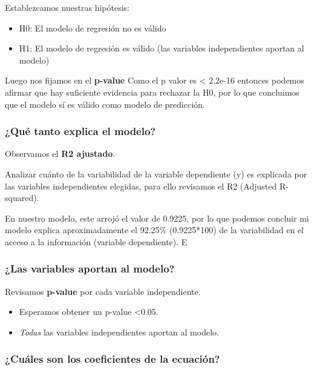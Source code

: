 \documentclass[
]{article}
\providecommand{\tightlist}{%
  \setlength{\itemsep}{0pt}\setlength{\parskip}{0pt}}
\begin{document}
Establezcamos nuestras hipótesis:

\begin{itemize}
\tightlist
\item
  H0: El modelo de regresión no es válido
\item
  H1: El modelo de regresión es válido (las variables independientes
  aportan al modelo)
\end{itemize}

Luego nos fijamos en el \textbf{p-value} Como el p valor es \textless{}
2.2e-16 entonces podemos afirmar que hay suficiente evidencia para
rechazar la H0, por lo que concluimos que el modelo sí es válido como
modelo de predicción.

\subsubsection{\texorpdfstring{\textbf{¿Qué tanto explica el
modelo?}}{¿Qué tanto explica el modelo?}}\label{quuxe9-tanto-explica-el-modelo-1}

Observamos el \textbf{R2 ajustado}.

Analizar cuánto de la variabilidad de la variable dependiente (y) es
explicada por las variables independientes elegidas, para ello revisamos
el R2 (Adjusted R-squared).

En nuestro modelo, este arrojó el valor de 0.9225, por lo que podemos
concluir mi modelo explica aproximadamente el 92.25\% (0.9225*100) de la
variabilidad en el acceso a la información (variable dependiente). E

\subsubsection{\texorpdfstring{\textbf{¿Las variables aportan al
modelo?}}{¿Las variables aportan al modelo?}}\label{las-variables-aportan-al-modelo-1}

Revisamos \textbf{p-value} por cada variable independiente.

\begin{itemize}
\tightlist
\item
  Esperamos obtener un p-value \textless0.05.
\item
  \emph{Todas} las variables independientes aportan al modelo.
\end{itemize}

\subsubsection{\texorpdfstring{\textbf{¿Cuáles son los coeficientes de
la
ecuación?}}{¿Cuáles son los coeficientes de la ecuación?}}\label{cuuxe1les-son-los-coeficientes-de-la-ecuaciuxf3n-1}
\end{document}
